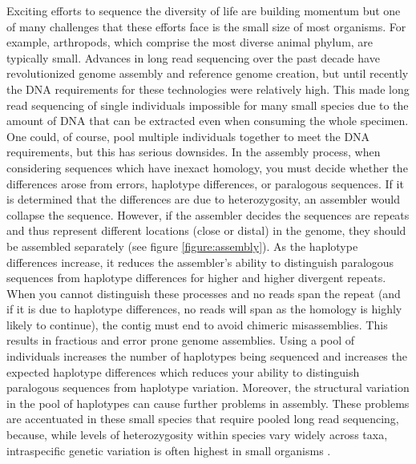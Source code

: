 \par{
Exciting efforts to sequence the diversity of life are building momentum \cite{Lewin2018-lc} but one of many challenges that these efforts face is the small size of most organisms. For example, arthropods, which comprise the most diverse animal phylum, are typically small. Advances in long read sequencing over the past decade have revolutionized genome assembly and reference genome creation\cite{pacbio}\cite{oxford}, but until recently the DNA requirements for these technologies were relatively high. This made long read sequencing of single individuals impossible for many small species due to the amount of DNA that can be extracted even when consuming the whole specimen. One could, of course, pool multiple individuals together to meet the DNA requirements, but this has serious downsides. In the assembly process, when considering sequences which have inexact homology, you must decide whether the differences arose from errors, haplotype differences, or paralogous sequences. If it is determined that the differences are due to heterozygosity, an assembler would collapse the sequence. However, if the assembler decides the sequences are repeats and thus represent different locations (close or distal) in the genome, they should be assembled separately (see figure \ref{figure:assembly}). As the haplotype differences increase, it reduces the assembler's ability to distinguish paralogous sequences from haplotype differences for higher and higher divergent repeats. When you cannot distinguish these processes and no reads span the repeat (and if it is due to haplotype differences, no reads will span as the homology is highly likely to continue), the contig must end to avoid chimeric misassemblies. This results in fractious and error prone genome assemblies. Using a pool of individuals increases the number of haplotypes being sequenced and increases the expected haplotype differences which reduces your ability to distinguish paralogous sequences from haplotype variation. Moreover, the structural variation in the pool of haplotypes can cause further problems in assembly. These problems are accentuated in these small species that require pooled long read sequencing, because, while levels of heterozygosity within species vary widely across taxa, intraspecific genetic variation is often highest in small organisms \cite{Leffler2012-uh}. 
}

